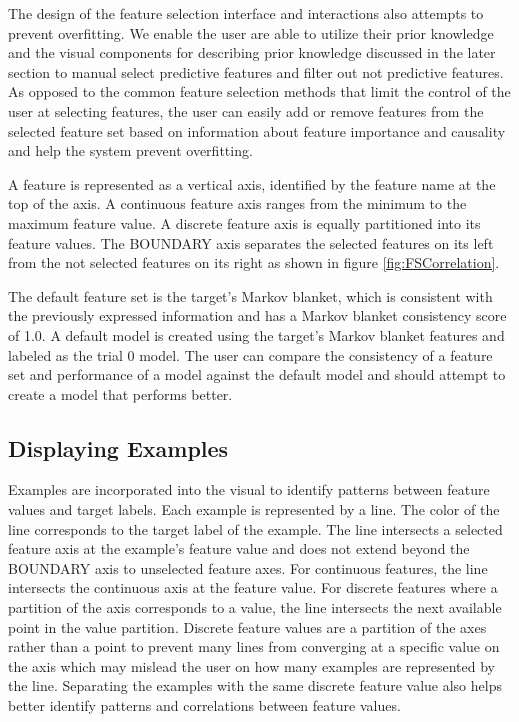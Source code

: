 The design of the feature selection interface and interactions also attempts to prevent overfitting. We enable the user are able to utilize their prior knowledge and the visual components for describing prior knowledge discussed in the later section to manual select predictive features and filter out not predictive features. As opposed to the common feature selection methods that limit the control of the user at selecting features, the user can easily add or remove features from the selected feature set based on information about feature importance and causality and help the system prevent overfitting.   

A feature is represented as a vertical axis, identified by the feature name at the top of the axis. A continuous feature axis ranges from the minimum to the maximum feature value. A discrete feature axis is equally partitioned into its feature values. The BOUNDARY axis separates the selected features on its left from the not selected features on its right as shown in figure \ref{fig:FSCorrelation}. 

The default feature set is the target's Markov blanket, which is consistent with the previously expressed information and has a Markov blanket consistency score of 1.0. A default model is created using the target's Markov blanket features and labeled as the trial 0 model. The user can compare the consistency of a feature set and performance of a model against the default model and should attempt to create a model that performs better. 

\subsection{Displaying Examples}
Examples are incorporated into the visual to identify patterns between feature values and target labels. Each example is represented by a line. The color of the line corresponds to the target label of the example. The line intersects a selected feature axis at the example's feature value and does not extend beyond the BOUNDARY axis to unselected feature axes. For continuous features, the line intersects the continuous axis at the feature value. For discrete features where a partition of the axis corresponds to a value, the line intersects the next available point in the value partition. Discrete feature values are a partition of the axes rather than a point to prevent many lines from converging at a specific value on the axis which may mislead the user on how many examples are represented by the line. Separating the examples with the same discrete feature value also helps better identify patterns and correlations between feature values. 

